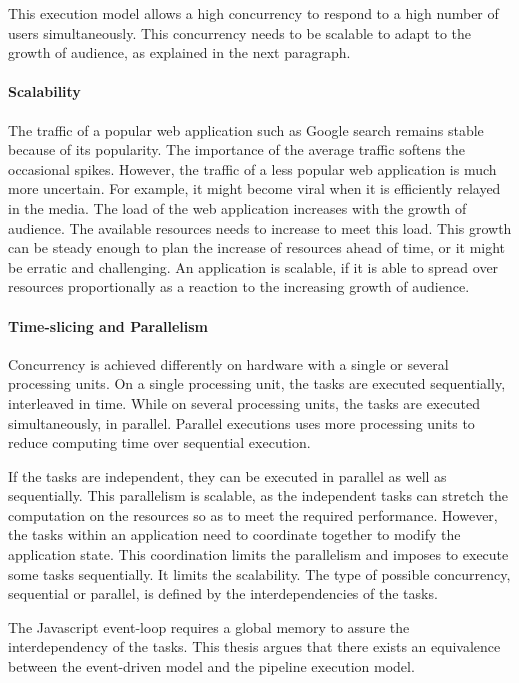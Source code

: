 This execution model allows a high concurrency to respond to a high number of users simultaneously.
This concurrency needs to be scalable to adapt to the growth of audience, as explained in the next paragraph.

\paragraph{Scalability}

The traffic of a popular web application such as Google search remains stable because of its popularity.
The importance of the average traffic softens the occasional spikes.
However, the traffic of a less popular web application is much more uncertain.
For example, it might become viral when it is efficiently relayed in the media.
The load of the web application increases with the growth of audience.
The available resources needs to increase to meet this load.
This growth can be steady enough to plan the increase of resources ahead of time, or it might be erratic and challenging.
An application is scalable, if it is able to spread over resources proportionally as a reaction to the increasing growth of audience.

\paragraph{Time-slicing and Parallelism}

Concurrency is achieved differently on hardware with a single or several processing units.
On a single processing unit, the tasks are executed sequentially, interleaved in time.
While on several processing units, the tasks are executed simultaneously, in parallel.
Parallel executions uses more processing units to reduce computing time over sequential execution.

If the tasks are independent, they can be executed in parallel as well as sequentially.
This parallelism is scalable, as the independent tasks can stretch the computation on the resources so as to meet the required performance.
However, the tasks within an application need to coordinate together to modify the application state.
This coordination limits the parallelism and imposes to execute some tasks sequentially.
It limits the scalability.
The type of possible concurrency, sequential or parallel, is defined by the interdependencies of the tasks.

The Javascript event-loop requires a global memory to assure the interdependency of the tasks.
This thesis argues that there exists an equivalence between the event-driven model and the pipeline execution model.

